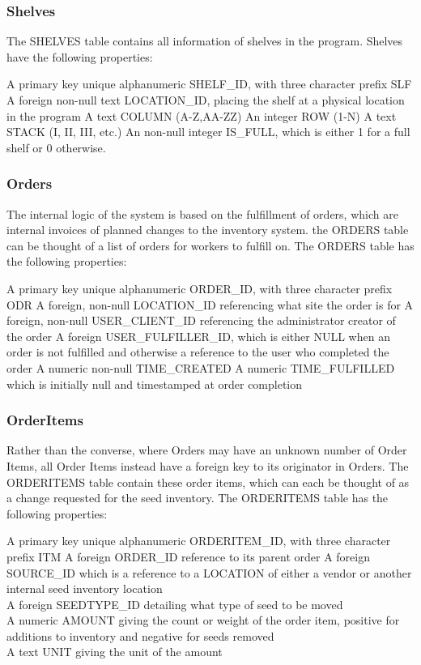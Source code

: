 \documentclass[12pt, letterpaper,oneocolumn]{article}
\begin{document}
	\subsubsection{Shelves}
The SHELVES table contains all information of shelves in the program. Shelves have the following properties:
\begin{outline}
	\1 A primary key unique alphanumeric SHELF\_ID, with three character prefix SLF
	\1 A foreign non-null text LOCATION\_ID, placing the shelf at a physical location in the program
	\1 A text COLUMN (A-Z,AA-ZZ)
	\1 An integer ROW (1-N)
	\1 A text STACK (I, II, III, etc.)
	\1 An non-null integer IS\_FULL, which is either 1 for a full shelf or 0 otherwise.
\end{outline}
	\subsubsection{Orders}
The internal logic of the system is based on the fulfillment of orders, which are internal invoices of planned changes to the inventory system. the ORDERS table can be thought of a list of orders for workers to fulfill on. The ORDERS table has the following properties:
\begin{outline}
	\1 A primary key unique alphanumeric ORDER\_ID, with three character prefix ODR
	\1 A foreign, non-null LOCATION\_ID referencing what site the order is for
	\1 A foreign, non-null USER\_CLIENT\_ID referencing the administrator creator of the order
	\1 A foreign USER\_FULFILLER\_ID, which is either NULL when an order is not fulfilled and otherwise a reference to the user who completed the order
	\1 A numeric non-null TIME\_CREATED
	\1 A numeric TIME\_FULFILLED which is initially null and timestamped at order completion
\end{outline}
		\subsubsection{OrderItems}
Rather than the converse, where Orders may have an unknown number of Order Items, all Order Items instead have a foreign key to its originator in Orders. The ORDERITEMS table contain these order items, which can each be thought of as a change requested for the seed inventory. The ORDERITEMS table has the following properties:\\
\begin{outline}
	\1 A primary key unique alphanumeric ORDERITEM\_ID, with three character prefix ITM
	\1 A foreign ORDER\_ID reference to its parent order
	\1 A foreign SOURCE\_ID which is a reference to  a LOCATION of either a vendor or another internal seed inventory location\\
	\1 A foreign SEEDTYPE\_ID detailing what type of seed to be moved\\
	\1 A numeric AMOUNT giving the count or weight of the order item, positive for additions to inventory and negative for seeds removed\\
	\1 A text UNIT giving the unit of the amount\\
\end{outline}
\end{document}
